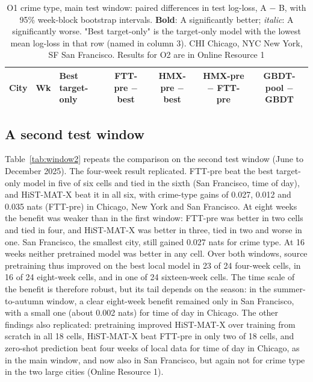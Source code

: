 \documentclass[11pt]{article}
\newcommand{\HMX}{HiST-MAT-X}
\begin{document}
\begin{table}[!htbp]
\centering
\caption{O1 crime type, main test window: paired differences in test log-loss, A $-$ B, with 95\% week-block bootstrap intervals. \textbf{Bold}: A significantly better; \textit{italic}: A significantly worse. "Best target-only" is the target-only model with the lowest mean log-loss in that row (named in column 3). CHI Chicago, NYC New York, SF San Francisco. Results for O2 are in Online Resource 1}
\label{tab:paired}
\scriptsize
\setlength{\tabcolsep}{2.5pt}
\begin{tabular}{lllcccc}
\toprule
City & Wk & Best target-only & FTT-pre $-$ best & HMX-pre $-$ best & HMX-pre $-$ FTT-pre & GBDT-pool $-$ GBDT \\
\midrule

\bottomrule
\end{tabular}
\end{table}

\subsection{A second test window}\label{sec:window2}
Table~\ref{tab:window2} repeats the comparison on the second test window (June to December 2025). The four-week result replicated. FTT-pre beat the best target-only model in five of six cells and tied in the sixth (San Francisco, time of day), and \HMX{} beat it in all six, with crime-type gains of 0.027, 0.012 and 0.035 nats (FTT-pre) in Chicago, New York and San Francisco. At eight weeks the benefit was weaker than in the first window: FTT-pre was better in two cells and tied in four, and \HMX{} was better in three, tied in two and worse in one. San Francisco, the smallest city, still gained 0.027 nats for crime type. At 16 weeks neither pretrained model was better in any cell. Over both windows, source pretraining thus improved on the best local model in 23 of 24 four-week cells, in 16 of 24 eight-week cells, and in one of 24 sixteen-week cells. The time scale of the benefit is therefore robust, but its tail depends on the season: in the summer-to-autumn window, a clear eight-week benefit remained only in San Francisco, with a small one (about 0.002 nats) for time of day in Chicago. The other findings also replicated: pretraining improved \HMX{} over training from scratch in all 18 cells, \HMX{} beat FTT-pre in only two of 18 cells, and zero-shot prediction beat four weeks of local data for time of day in Chicago, as in the main window, and now also in San Francisco, but again not for crime type in the two large cities (Online Resource 1).
\end{document}
